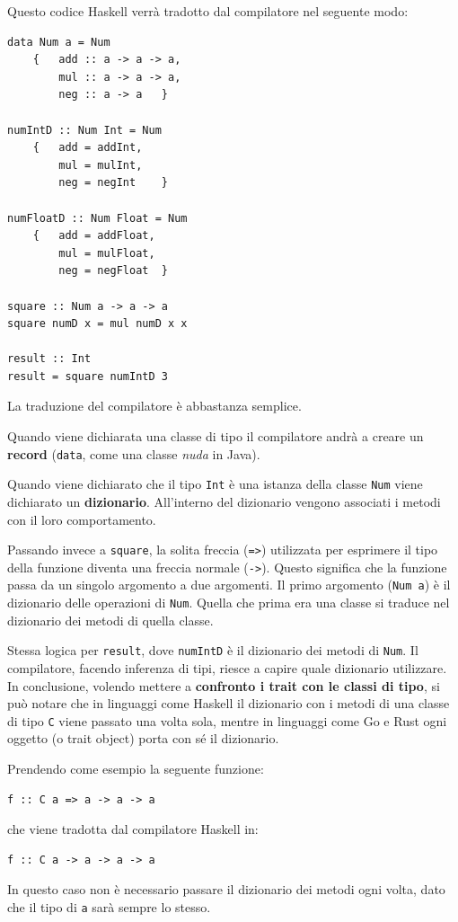 \documentclass{article}
\begin{document}
Questo codice Haskell verrà tradotto dal compilatore nel seguente modo:

\begin{tcolorbox}
\begin{verbatim}
data Num a = Num
    {   add :: a -> a -> a,
        mul :: a -> a -> a,
        neg :: a -> a   }

numIntD :: Num Int = Num
    {   add = addInt,
        mul = mulInt,
        neg = negInt    }

numFloatD :: Num Float = Num
    {   add = addFloat,
        mul = mulFloat,
        neg = negFloat  }

square :: Num a -> a -> a
square numD x = mul numD x x

result :: Int
result = square numIntD 3
\end{verbatim}
\end{tcolorbox}

La traduzione del compilatore è abbastanza semplice.

Quando viene dichiarata una classe di tipo il compilatore andrà a creare un \textbf{record} (\texttt{data}, come una classe \textit{nuda} in Java).

Quando viene dichiarato che il tipo \texttt{Int} è una istanza della classe \texttt{Num} viene dichiarato un \textbf{dizionario}. All'interno del dizionario vengono associati i metodi con il loro comportamento.

Passando invece a \texttt{square}, la solita freccia (\texttt{=>}) utilizzata per esprimere il tipo della funzione diventa una freccia normale (\texttt{->}). Questo significa che la funzione passa da un singolo argomento a due argomenti. Il primo argomento (\texttt{Num a}) è il dizionario delle operazioni di \texttt{Num}. Quella che prima era una classe si traduce nel dizionario dei metodi di quella classe.

Stessa logica per \texttt{result}, dove \texttt{numIntD} è il dizionario dei metodi di \texttt{Num}. Il compilatore, facendo inferenza di tipi, riesce a capire quale dizionario utilizzare.\vspace{14pt}\\
In conclusione, volendo mettere a \textbf{confronto i trait con le classi di tipo}, si può notare che in linguaggi come Haskell il dizionario con i metodi di una classe di tipo \texttt{C} viene passato una volta sola, mentre in linguaggi come Go e Rust ogni oggetto (o trait object) porta con sé il dizionario.

Prendendo come esempio la seguente funzione:
\begin{tcolorbox}
\begin{verbatim}
f :: C a => a -> a -> a
\end{verbatim}
\end{tcolorbox}
che viene tradotta dal compilatore Haskell in:
\begin{tcolorbox}
\begin{verbatim}
f :: C a -> a -> a -> a
\end{verbatim}
\end{tcolorbox}

In questo caso non è necessario passare il dizionario dei metodi ogni volta, dato che il tipo di \texttt{a} sarà sempre lo stesso.
\end{document}
